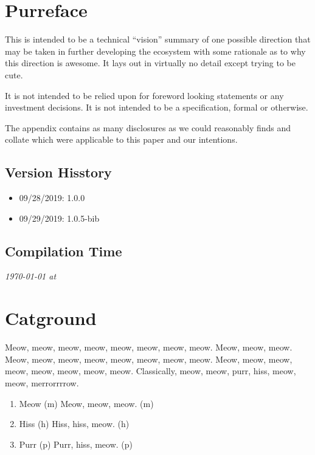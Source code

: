 \documentclass[9pt,oneside]{amsart}
\newcommand*\lipsumeow{Meow, meow, meow, meow, meow, meow, meow, meow.  Meow, meow, meow. Meow, meow, meow, meow, meow, meow, meow, meow. Meow, meow, meow, meow, meow, meow, meow, meow. }
\begin{document}
\begin{multicols}{2}
\section{Purreface}\label{sec:preface}
 This is intended to be a technical ``vision'' summary of one possible direction that may be taken in further developing the \meow{} ecosystem with some rationale as to why this direction is awesome. It lays out in virtually no detail except trying to be cute.

 It is not intended to be relied upon for foreword looking statements or any investment decisions. It is not intended to be a specification, formal or otherwise. 

 The appendix contains as many disclosures as we could reasonably finds and collate which were applicable to this paper and our intentions.


\subsection{Version Hisstory}\label{subsec:history}

\begin{itemize}
 \item 09/28/2019: 1.0.0
 \item 09/29/2019: 1.0.5-bib
\end{itemize}

\subsection{Compilation Time}\label{subsec:compilation}

 \textit{{\ddmmyyyydate\today} at \currenttime}


\section{Catground}\label{sec:background}
 \lipsumeow{} 
 Classically, meow, meow, purr, hiss, meow, meow, merrorrrrow.

\begin{enumerate}
 \item Meow (m) Meow, meow, meow. (m)
 \item Hiss (h) Hiss, hiss, meow. (h)
 \item Purr (p) Purr, hiss, meow. (p)
\end{enumerate}


\end{multicols}
\end{document}
